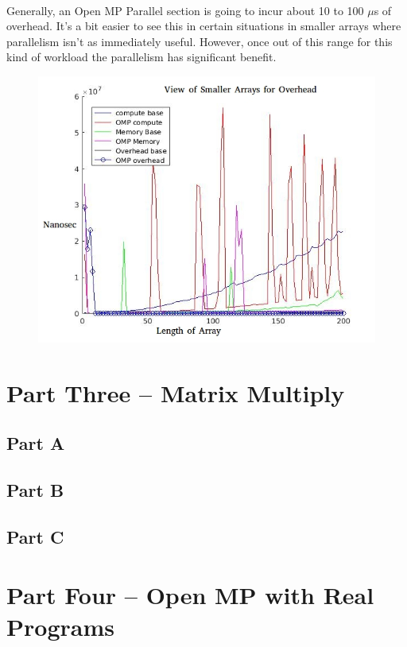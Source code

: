 \documentclass[12pt,8.5in,11in]{article}
\begin{document}
\paragraph{}
Generally, an Open MP Parallel section is going to incur about 10 to 100 $\mu$s of overhead.  It's a bit easier to see this in certain situations in smaller arrays where parallelism isn't as immediately useful.  However, once out of this range for this kind of workload the parallelism has significant benefit.

\begin{figure}[h!]
	\centering
	\includegraphics[scale=0.3]{part2small}
\end{figure}

\section{Part Three -- Matrix Multiply}

	\subsection{Part A}
	
	\subsection{Part B}
	
	\subsection{Part C}
	
\section{Part Four -- Open MP with Real Programs}	
	
\end{document}
